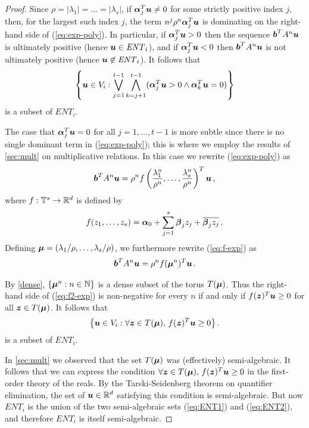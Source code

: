 \begin{proof}
Since $\rho=|\lambda_1|=\ldots=|\lambda_s|$, if
$\boldsymbol{\alpha}_j^T\boldsymbol{u}\neq 0$ for some strictly
positive index $j$, then, for the largest such index $j$, the term
$n^{j}\rho^n\boldsymbol{\alpha}_{j}^T\boldsymbol{u}$ is
dominating on the right-hand side of (\ref{eq:exp-poly}).  In
particular, if $\boldsymbol{\alpha}_{j}^T\boldsymbol{u}>0$ then the
sequence $\boldsymbol{b}^TA^n\boldsymbol{u}$ is ultimately positive
(hence $\boldsymbol{u}\in \mathit{ENT}_i$), and if
$\boldsymbol{\alpha}_{j}^T\boldsymbol{u}<0$ then
$\boldsymbol{b}^TA^n\boldsymbol{u}$ is not ultimately positive (hence
$\boldsymbol{u}\not\in\mathit{ENT}_i$).  It follows that
\begin{gather}
\left\{ \myvector{u} \in V_i : \bigvee_{j=1}^{t-1}\bigwedge_{k=j+1}^{t-1}
(\myvector{\alpha}_j^T \myvector{u}>0 \wedge
\myvector{\alpha}_k^T \myvector{u}=0) \right\}
\label{eq:ENT1}
\end{gather}
is a subset of $\mathit{ENT}_i$.

The case that $\boldsymbol{\alpha}_j^T\boldsymbol{u}=0$ for all
$j=1,\ldots,t-1$ is more subtle since there is no single dominant term
in (\ref{eq:exp-poly}); this is where we employ the results of
\cref{sec:mult} on multiplicative relations. In this case we
rewrite (\ref{eq:exp-poly}) as
\begin{gather}
\myvector{b}^T A^n \myvector{u} =
 \rho^n f\left(\frac{\lambda^n_1}{\rho^n},\ldots,
               \frac{\lambda^n_s}{\rho^n}\right)^T \myvector{u} \, ,
\label{eq:f-exp}
\end{gather}
where $f:\mathbb{T}^s\rightarrow\mathbb{R}^d$ is defined by
\[f(z_1,\ldots,z_s)=\boldsymbol{\alpha}_0 + \sum_{j=1}^s \boldsymbol{\beta}_jz_j + \overline{\boldsymbol{\beta}_jz_j} \, .\]
Defining $\boldsymbol\mu=(\lambda_1/\rho,\ldots,\lambda_s/\rho)$, we furthermore rewrite (\ref{eq:f-exp}) as
\begin{gather}
\myvector{b}^T A^n \myvector{u} =
    \rho^n f(\myvector\mu^n)^T \myvector{u} \, .
\label{eq:f2-exp}
\end{gather}

By \cref{dense}, $\{ \boldsymbol\mu^n : n \in
\mathbb{N} \}$ is a dense subset of the torus $T(\boldsymbol{\mu})$.
Thus the right-hand side of (\ref{eq:f2-exp}) is non-negative for
every $n$ if and only if $f(\boldsymbol{z})^T\boldsymbol{u}\geq 0$ for
all $\boldsymbol{z}\in T(\boldsymbol{\mu})$.  It follows that
\begin{gather} \big \{ \myvector{u}\in V_i :
\forall \myvector{z}\in T(\myvector{\mu}),\,
                              f(\myvector{z})^T\myvector{u}\geq 0
\big\}\, .
\label{eq:ENT2}
\end{gather}
is a subset of $\mathit{ENT}_i$.

In \cref{sec:mult} we observed that the set
$T(\boldsymbol{\mu})$ was (effectively) semi-algebraic.  It follows
that we can express the condition $\forall \boldsymbol{z}\in
T(\boldsymbol{\mu}),\, f(\boldsymbol{z})^T\boldsymbol{u}\geq 0$ in the
first-order theory of the reals.  By the Tarski-Seidenberg theorem
\cite{Tar51} on quantifier elimination, the set of $\boldsymbol{u}\in
\mathbb{R}^d$ satisfying this condition is semi-algebraic.  But now
$\mathit{ENT}_i$ is the union of the two semi-algebraic sets
(\ref{eq:ENT1}) and (\ref{eq:ENT2}), and therefore $\mathit{ENT}_i$ is
itself semi-algebraic.
\end{proof}
